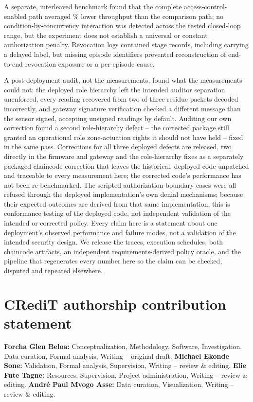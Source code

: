 \documentclass[a4paper,fleqn]{cas-sc}
\begin{document}
A separate, interleaved benchmark found that the complete
access-control-enabled path averaged \OverheadMeanPct\% lower throughput
than the comparison path; no condition-by-concurrency interaction was
detected across the tested closed-loop range, but the experiment does not
establish a universal or constant authorization penalty. Revocation logs
contained \RevEvents{} stage records, including \RevDelayed{} carrying a
delayed label, but missing episode identifiers prevented reconstruction
of end-to-end revocation exposure or a per-episode cause.

A post-deployment audit, not the measurements, found what the
measurements could not: the deployed role hierarchy left the intended
auditor separation unenforced, every reading recovered from two of three
residue packets decoded incorrectly, and gateway signature verification
checked a different message than the sensor signed, accepting unsigned
readings by default. Auditing our own correction found a second
role-hierarchy defect -- the corrected package still granted an
operational role zone-actuation rights it should not have held -- fixed
in the same pass. Corrections for all three deployed defects are
released, two directly in the firmware and gateway and the role-hierarchy
fixes as a separately packaged chaincode correction that leaves the
historical, deployed code unpatched and traceable to every measurement
here; the corrected code's performance has not been re-benchmarked. The
\SecAttempts{} scripted authorization-boundary cases were all refused
through the deployed implementation's own denial mechanisms; because
their expected outcomes are derived from that same implementation, this
is conformance testing of the deployed code, not independent validation
of the intended or corrected policy. Every claim here is a statement
about one deployment's observed performance and failure modes, not a
validation of the intended security design. We release the traces,
execution schedules, both chaincode artifacts, an independent
requirements-derived policy oracle, and the pipeline that regenerates
every number here so the claim can be checked, disputed and repeated
elsewhere.

\section*{CRediT authorship contribution statement}

\textbf{Forcha Glen Beloa:} Conceptualization, Methodology, Software,
Investigation, Data curation, Formal analysis, Writing -- original draft.
\textbf{Michael Ekonde Sone:} Validation, Formal analysis, Supervision,
Writing -- review \& editing. \textbf{Elie Fute Tagne:} Resources,
Supervision, Project administration, Writing -- review \& editing.
\textbf{Andr\'{e} Paul Mvogo Asse:} Data curation, Visualization,
Writing -- review \& editing.
\end{document}
